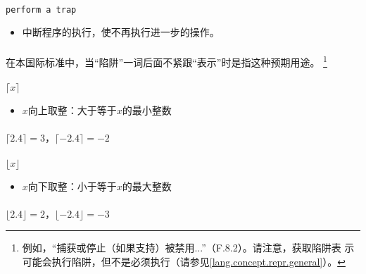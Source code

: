 \paragraph{}
\texttt{perform a trap}
\begin{itemize}
  \item[]{中断程序的执行，使不再执行进一步的操作。}
\end{itemize}

\paragraph{}
\notes* 在本国际标准中，当``陷阱''一词后面不紧跟``表示''时是指这种预期用途。
\footnote{例如，``捕获或停止（如果支持）被禁用...''（F.8.2）。请注意，获取陷阱表
示可能会执行陷阱，但不是必须执行（请参见\ref{lang.concept.repr.general}）。}

\paragraph{}
\texttt{$\lceil x\rceil$}
\begin{itemize}
  \item[]{$x$向上取整：大于等于$x$的最小整数}
\end{itemize}

\paragraph{}
\ex* $\lceil 2.4 \rceil = 3$，$\lceil -2.4 \rceil = -2$

\paragraph{}
\texttt{$\lfloor x\rfloor$}
\begin{itemize}
  \item[]{$x$向下取整：小于等于$x$的最大整数}
\end{itemize}

\paragraph{}
\ex* $\lfloor 2.4 \rfloor = 2$，$\lfloor -2.4 \rfloor = -3$

